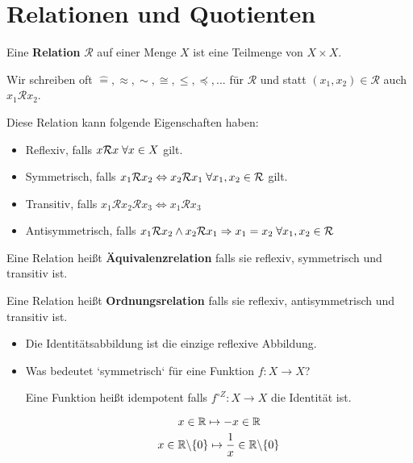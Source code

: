 \documentclass[main.tex]{subfiles}
\begin{document}
\section{Relationen und Quotienten}


\begin{Definition}[Relation]
  Eine \textbf{Relation} $\mathcal{R}$ auf einer Menge $X$ ist eine Teilmenge von $X\times X$.

  Wir schreiben oft $\widehat{=},\approx,\sim,\cong,\leq,\preccurlyeq,...$ für $\mathcal{R}$ und statt $(x_1,x_2)\in \mathcal{R}$ auch $x_1 \mathcal{R} x_2$.

  Diese Relation kann folgende Eigenschaften haben:
  \begin{itemize}
    \item Reflexiv, falls $x \mathcal{R} x \;\forall x \in X$ gilt.
    \item Symmetrisch, falls $x_1 \mathcal{R} x_2 \Leftrightarrow x_2 \mathcal{R} x_1 \;\forall x_1,x_2 \in \mathcal{R}$ gilt.
    \item Transitiv, falls $x_1 \mathcal{R} x_2 \mathcal{R} x_3 \Leftrightarrow x_1 \mathcal{R} x_3$
    \item Antisymmetrisch, falls $x_1 \mathcal{R} x_2 \land x_2 \mathcal{R} x_1 \Rightarrow x_1 = x_2 \;\forall x_1,x_2 \in \mathcal{R}$
  \end{itemize}
  Eine Relation heißt \textbf{Äquivalenzrelation} falls sie reflexiv, symmetrisch und transitiv ist.

  Eine Relation heißt \textbf{Ordnungsrelation} falls sie reflexiv, antisymmetrisch und transitiv ist.
\end{Definition}

\begin{Beispiel}
  \begin{itemize}
    \item Die Identitätsabbildung ist die einzige reflexive Abbildung.
    \item Was bedeutet `symmetrisch` für eine Funktion $f:X \to X$?

      Eine Funktion heißt idempotent falls $f^{\circ Z}:X\to X$ die Identität ist.
    \begin{Beispiel}
      $$x\in \mathbb{R} \mapsto -x \in \mathbb{R}$$
      $$ x\in \mathbb{R}\backslash \{ 0\} \mapsto \dfrac{1}{x}\in \mathbb{R}\backslash \{ 0\}$$
    \end{Beispiel}
  \end{itemize}
\end{Beispiel}
\end{document}
